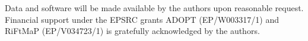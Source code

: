 \documentclass[sn-mathphys-num]{sn-jnl}
\begin{document}
Data and software will be made available by the authors upon reasonable request.
Financial support under the EPSRC grants ADOPT (EP/W003317/1) and RiFtMaP (EP/V034723/1) is gratefully acknowledged by the authors. 




\bigskip

\end{document}
